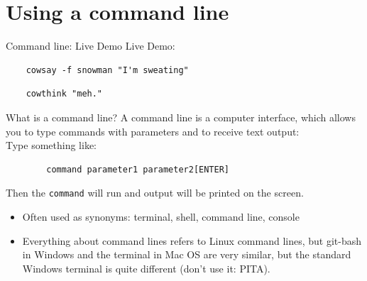 
\subtitle{Command line, GIT and version control}
\date{2020-03-19}


\begin{frame}

	\tableofcontents

\end{frame}

\section{Using a command line}

\begin{frame}[fragile]{Command line: Live Demo}
    Live Demo:
    \begin{verbatim}
    cowsay -f snowman "I'm sweating"
    \end{verbatim}
    \begin{verbatim}
    cowthink "meh."
    \end{verbatim}
\end{frame}

\begin{frame}[fragile]{What is a command line?}
    A command line is a computer interface, which allows you to type commands with parameters
    and to receive text output:\\

    Type something like:
    \begin{verbatim}
        command parameter1 parameter2[ENTER]\end{verbatim}
    Then the \verb|command| will run and output will be printed on the screen.
    \bigskip
    \pause
    \begin{itemize}
        \item Often used as synonyms: terminal, shell, command line, console
        \item Everything about command lines refers to Linux command lines, but git-bash in Windows
            and the terminal in Mac OS are very similar, but the standard Windows terminal is quite different
            (don't use it: PITA).
    \end{itemize}
\end{frame}

